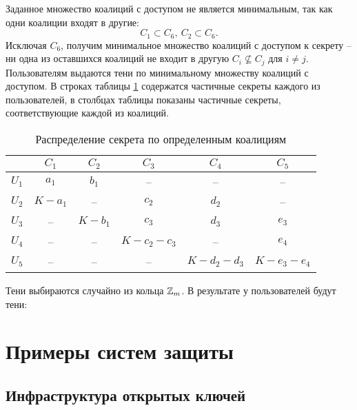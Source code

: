 \documentclass[10pt,a4paper]{book}
\newcommand{\exampleend}
\newcommand{\group}[1]{\mathbb{#1}}
\newcommand{\Z}{\group{Z}}
\begin{document}
Заданное множество коалиций с доступом не является минимальным, так как одни коалиции входят в другие:
    \[ C_1 \subset C_6, ~ C_2 \subset C_6. \]
Исключая $C_6$, получим минимальное множество коалиций с доступом к секрету -- ни одна из оставшихся коалиций не входит в другую $C_i \nsubseteq C_j$ для $i \neq j$. Пользователям выдаются тени по минимальному множеству коалиций с доступом. В строках таблицы \ref{tab:secret-share-coalition-2} содержатся частичные секреты каждого из пользователей, в столбцах таблицы показаны частичные секреты, соответствующие каждой из коалиций.

\begin{table}[!ht]
    \centering
    \caption{Распределение секрета по определенным коалициям\label{tab:secret-share-coalition-2}}
    \begin{tabular}{|c||c|c|c|c|c|}
        \hline
              & $C_1$     & $C_2$     & $C_3$           & $C_4$           & $C_5$  \\
        \hline \hline
        $U_1$ & $a_1$     & $b_1$     & --              & --              & -- \\
        $U_2$ & $K - a_1$ & --        & $c_2$           & $d_2$           & --\\
        $U_3$ & --        & $K - b_1$ & $c_3$           & $d_3$           & $e_3$ \\
        $U_4$ & --        & --        & $K - c_2 - c_3$ & --              & $e_4$ \\
        $U_5$ & --        & --        & --              & $K - d_2 - d_3$ & $K - e_3 - e_4$ \\
        \hline
    \end{tabular}
\end{table}

Тени выбираются случайно из кольца $\mathbb{\Z}_m$. В результате у пользователей будут тени:





\chapter{Примеры систем защиты}



\section{Инфраструктура открытых ключей}
\end{document}
